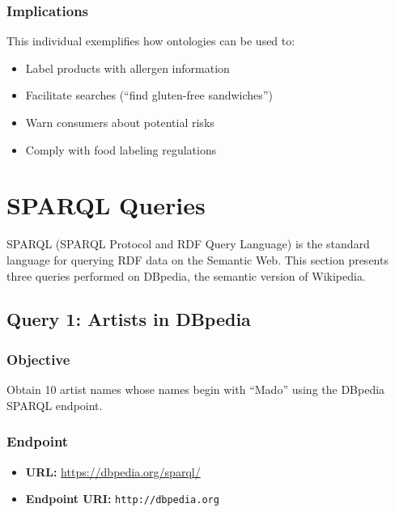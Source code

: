 \documentclass[12pt,a4paper]{article}
\begin{document}
\subsubsection{Implications}

This individual exemplifies how ontologies can be used to:
\begin{itemize}
    \item Label products with allergen information
    \item Facilitate searches (``find gluten-free sandwiches'')
    \item Warn consumers about potential risks
    \item Comply with food labeling regulations
\end{itemize}

\section{SPARQL Queries}

SPARQL (SPARQL Protocol and RDF Query Language) is the standard language for querying RDF data on the Semantic Web. This section presents three queries performed on DBpedia, the semantic version of Wikipedia.

\subsection{Query 1: Artists in DBpedia}

\subsubsection{Objective}

Obtain 10 artist names whose names begin with ``Mado'' using the DBpedia SPARQL endpoint.

\subsubsection{Endpoint}

\begin{itemize}
    \item \textbf{URL:} \url{https://dbpedia.org/sparql/}
    \item \textbf{Endpoint URI:} \texttt{http://dbpedia.org}
\end{itemize}
\end{document}
